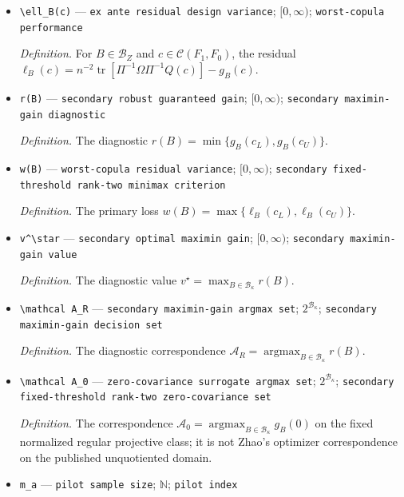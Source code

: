 \documentclass{article}
\begin{document}
\begin{itemize}
  \item \texttt{\textbackslash{}\allowbreak{}ell\_\allowbreak{}B(c)} --- \texttt{ex ante residual design variance}; \([0,\infty)\); \texttt{worst-\allowbreak{}copula performance}
  \par\smallskip\noindent\emph{Definition.} For \(B\in\mathcal B_Z\) and \(c\in\mathcal C(F_1,F_0)\), the residual \(\ell_B(c)=n^{-2}\operatorname{tr}[\Pi^{-1}\Omega\Pi^{-1}Q(c)]-g_B(c)\).
  \item \texttt{r(B)} --- \texttt{secondary robust guaranteed gain}; \([0,\infty)\); \texttt{secondary maximin-\allowbreak{}gain diagnostic}
  \par\smallskip\noindent\emph{Definition.} The diagnostic \(r(B)=\min\{g_B(c_L),g_B(c_U)\}\).
  \item \texttt{w(B)} --- \texttt{worst-\allowbreak{}copula residual variance}; \([0,\infty)\); \texttt{secondary fixed-\allowbreak{}threshold rank-\allowbreak{}two minimax criterion}
  \par\smallskip\noindent\emph{Definition.} The primary loss \(w(B)=\max\{\ell_B(c_L),\ell_B(c_U)\}\).
  \item \texttt{v\textasciicircum{}\textbackslash{}\allowbreak{}star} --- \texttt{secondary optimal maximin gain}; \([0,\infty)\); \texttt{secondary maximin-\allowbreak{}gain value}
  \par\smallskip\noindent\emph{Definition.} The diagnostic value \(v^\star=\max_{B\in\mathcal B_\kappa}r(B)\).
  \item \texttt{\textbackslash{}\allowbreak{}mathcal A\_\allowbreak{}R} --- \texttt{secondary maximin-\allowbreak{}gain argmax set}; \(2^{\mathcal B_\kappa}\); \texttt{secondary maximin-\allowbreak{}gain decision set}
  \par\smallskip\noindent\emph{Definition.} The diagnostic correspondence \(\mathcal A_R=\operatorname*{argmax}_{B\in\mathcal B_\kappa}r(B)\).
  \item \texttt{\textbackslash{}\allowbreak{}mathcal A\_\allowbreak{}0} --- \texttt{zero-\allowbreak{}covariance surrogate argmax set}; \(2^{\mathcal B_\kappa}\); \texttt{secondary fixed-\allowbreak{}threshold rank-\allowbreak{}two zero-\allowbreak{}covariance set}
  \par\smallskip\noindent\emph{Definition.} The correspondence \(\mathcal A_0=\operatorname*{argmax}_{B\in\mathcal B_\kappa}g_B(0)\) on the fixed normalized regular projective class; it is not Zhao's optimizer correspondence on the published unquotiented domain.
  \item \texttt{m\_\allowbreak{}a} --- \texttt{pilot sample size}; \(\mathbb N\); \texttt{pilot index}

\end{itemize}
\end{document}
